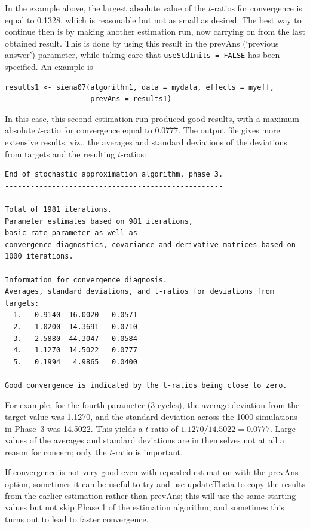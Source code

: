 \documentclass[a4paper,fleqn,11pt]{article}
\newcommand{\+}{\, + \,}
\newcommand{\sfn}[1]{\textsf{#1}}
\begin{document}
In the example above, the largest absolute value of the $t$-ratios for convergence
is equal to 0.1328, which is reasonable but not as small as desired.
The best way to continue then is by making another estimation run,
now carrying on from the last obtained result. This is done by
using this result in the \textsf{prevAns} (`previous answer')
parameter, while taking care that  \texttt{useStdInits = FALSE}
has been specified. An example is
\begin{verbatim}
results1 <- siena07(algorithm1, data = mydata, effects = myeff,
                    prevAns = results1)
\end{verbatim}
In this case, this second estimation run produced good results, with a
maximum absolute   $t$-ratio for convergence equal to 0.0777.
The output file gives more extensive results, viz.,
 the averages and standard deviations of the
deviations from targets and the resulting $t$-ratios:

{\footnotesize
\begin{verbatim}
End of stochastic approximation algorithm, phase 3.
---------------------------------------------------

Total of 1981 iterations.
Parameter estimates based on 981 iterations,
basic rate parameter as well as
convergence diagnostics, covariance and derivative matrices based on 1000 iterations.

Information for convergence diagnosis.
Averages, standard deviations, and t-ratios for deviations from targets:
  1.   0.9140  16.0020   0.0571
  2.   1.0200  14.3691   0.0710
  3.   2.5880  44.3047   0.0584
  4.   1.1270  14.5022   0.0777
  5.   0.1994   4.9865   0.0400

Good convergence is indicated by the t-ratios being close to zero.
\end{verbatim}
}
For example, for the fourth parameter (3-cycles), the average deviation
from the target value was 1.1270, and the standard deviation across the
1000 simulations in Phase~3 was  14.5022. This yields a $t$-ratio
of $1.1270/14.5022 = 0.0777$.
Large values of the averages and standard deviations are
in themselves not at all a reason for concern; only the
$t$-ratio is important.
\medskip

If convergence is not very good even with repeated estimation with
the \sfn{prevAns} option, sometimes it can be useful to try and use
\sfn{updateTheta} to copy the results from the earlier estimation
rather than \sfn{prevAns}; this will use the same starting values
but not skip Phase 1 of the estimation algorithm, and sometimes
this turns out to lead to faster convergence.
\end{document}

